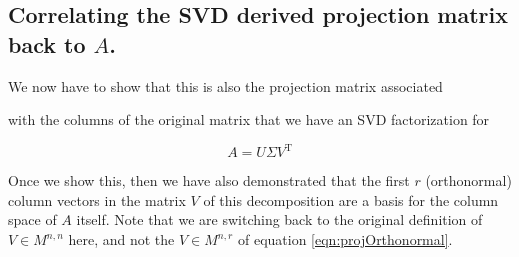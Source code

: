 \documentclass{article}      %
\newcommand{\T}[0]{\text{T}}
\begin{document}
\subsection{ Correlating the SVD derived projection matrix back to $A$. }


We now have to show that this is also the projection matrix associated

with the columns of the 
original matrix that we have an SVD factorization for

\[
A = U \Sigma V^\T
\]

Once we show this, then we have also demonstrated that the first $r$ 
(orthonormal) column vectors in the matrix $V$ of this decomposition
are a basis for the column space of $A$ itself.  Note that we are
switching back to the original definition of $V \in M^{n,n}$ here, and
not the $V \in M^{n,r}$ of equation \ref{eqn:projOrthonormal}.
\end{document}
